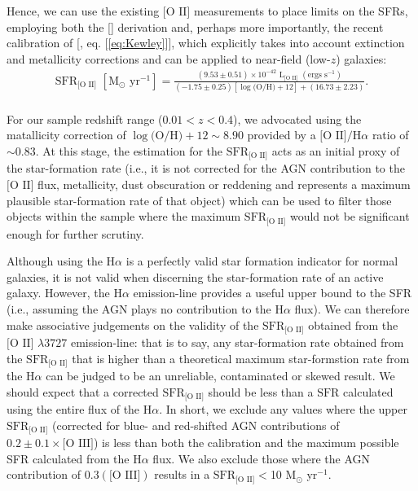 Hence, we can use the existing $\text{[O II]}$ measurements to place limits on the SFRs, employing both the [\cite{Kennicutt_1998}] derivation and, perhaps more importantly, the recent calibration of [\cite{Kewley_2004}, eq. [\ref{eq:Kewley}]], which explicitly takes into account extinction and metallicity corrections and can be applied to near-field (low-$z$) galaxies:
\\
\begin{equation}
\begin{align}
\label{eq:Kewley}
{\text{SFR}}_{\text{[O II]}}\,\,[\text{M}_\odot \text{ yr}^{-1}]=\frac{(9.53\pm{0.51})\times10^{-42}\,\,\text{L}_{\text{[O II]}}\,\,(\text{ergs }\text{s}^{-1})}{(-1.75\pm{0.25})[\log{\text{(O/H)}}+12]+(16.73\pm{2.23})}.
\end{align}
\end{equation}
\\
For our sample redshift range (${{0.01}<{z}<{0.4}}$), we advocated using the \cite{Teplitz_2003} matallicity correction of $\log{\text{(O/H)} +12}\sim{8.90}$ provided by a $\text{[O II]/H}\alpha$ ratio of $\sim{0.83}$. At this stage, the \cite{Kennicutt_1998} estimation for the $\text{SFR}_{\text{[O II]}}$ acts as an initial proxy of the star-formation rate (i.e., it is not corrected for the AGN contribution to the $\text{[O II]}$ flux, metallicity, dust obscuration or reddening and represents a maximum plausible star-formation rate of that object) which can be used to filter those objects within the sample where the maximum $\text{SFR}_{\text{[O II]}}$ would not be significant enough for further scrutiny.

Although using the $\text{H}\alpha$ is a perfectly valid star formation indicator for normal galaxies, it is not valid when discerning the star-formation rate of an active galaxy. However, the $\text{H}\alpha$ emission-line provides a useful upper bound to the SFR (i.e., assuming the AGN plays no contribution to the $\text{H}\alpha$ flux). We can therefore make associative judgements on the validity of the $\text{SFR}_{\text{[O II]}}$ obtained from the $\text{[O II] }\lambda3727$ emission-line: that is to say, any star-formation rate obtained from the $\text{SFR}_{\text{[O II]}}$ that is higher than a theoretical maximum star-formstion rate from the $\text{H}\alpha$ can be judged to be an unreliable, contaminated or skewed result. We should expect that a corrected $\text{SFR}_{\text{[O II]}}$ should be less than a $\text{SFR}$ calculated using the entire flux of the $\text{H}\alpha$. In short, we exclude any values where the upper $\text{SFR}_{\text{[O II]}}$ (corrected for blue- and red-shifted AGN contributions of $0.2\pm{0.1}\times\text{[O III]}$) is less than both the \cite{Kennicutt_1998} calibration and the maximum possible SFR calculated from the $\text{H}\alpha$ flux. We also exclude those where the AGN contribution of $0.3(\text{[O III]})$ results in a $\text{SFR}_{\text{[O II]}}{<}$10 M$_\odot$ yr$^{-1}$.

